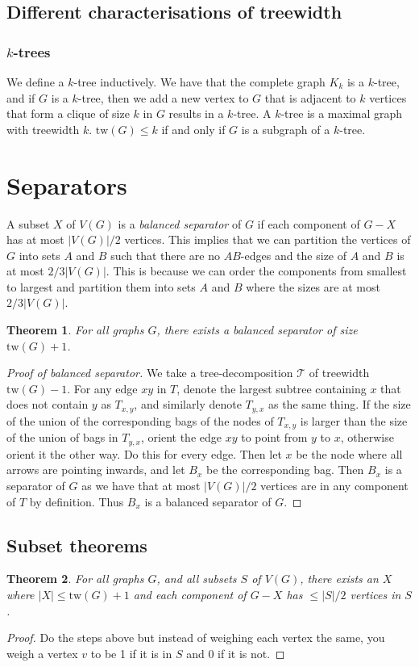 \documentclass[]{article}
\newcommand{\tree}{\mathcal{T}}
\newcommand{\tw}{\text{tw}}
\newtheorem{theorem}{Theorem}
\theoremstyle{definition}
\numberwithin{theorem}{section}
\numberwithin{equation}{section}
\begin{document}
\subsection{Different characterisations of treewidth}
\subsubsection{$k$-trees}
We define a $k$-tree inductively. We have that the complete graph $K_k$ is a $k$-tree, and if $G$ is a $k$-tree, then we add a new vertex to $G$ that is adjacent to $k$ vertices that form a clique of size $k$ in $G$ results in a $k$-tree. 
A $k$-tree is a maximal graph with treewidth $k$. $\tw(G) \leq k$ if and only if $G$ is a subgraph of a $k$-tree. 

\section{Separators}
A subset $X$ of $V(G)$ is a \textit{balanced separator} of $G$ if each component of $G - X$ has at most $|V(G)|/2$ vertices. This implies that we can partition the vertices of $G$ into sets $A$ and $B$ such that there are no $AB$-edges and the size of $A$ and $B$ is at most $2/3 |V(G)|$. This is because we can order the components from smallest to largest and partition them into sets $A$ and $B$ where the sizes are at most $2/3 |V(G)|$.

\begin{theorem}
	For all graphs $G$, there exists a balanced separator of size $\tw(G) + 1$. 
\end{theorem}
\begin{proof}[Proof of balanced separator]
	We take a tree-decomposition $\tree$ of treewidth $\tw(G) - 1$. For any edge $xy$ in $T$, denote the largest subtree containing $x$ that does not contain $y$ as $T_{x,y}$, and similarly denote $T_{y, x}$ as the same thing. If the size of the union of the corresponding bags of the nodes of $T_{x,y}$ is larger than the size of the union of bags in $T_{y, x}$, orient the edge $xy$ to point from $y$ to $x$, otherwise orient it the other way. Do this for every edge. Then let $x$ be the node where all arrows are pointing inwards, and let $B_x$ be the corresponding bag. Then $B_x$ is a separator of $G$ as we have that at most $|V(G)|/2$ vertices are in any component of $T$ by definition. Thus $B_x$ is a balanced separator of $G$. 
\end{proof}

\subsection{Subset theorems}
\begin{theorem}
	For all graphs $G$, and all subsets $S$ of $V(G)$, there exists an $X$ where $|X| \leq \tw(G) + 1$ and each component of $G - X$ has $\leq |S|/2$ vertices in $S$. 
\end{theorem}
\begin{proof}
	Do the steps above but instead of weighing each vertex the same, you weigh a vertex $v$ to be 1 if it is in $S$ and 0 if it is not. 
\end{proof}
\end{document}
